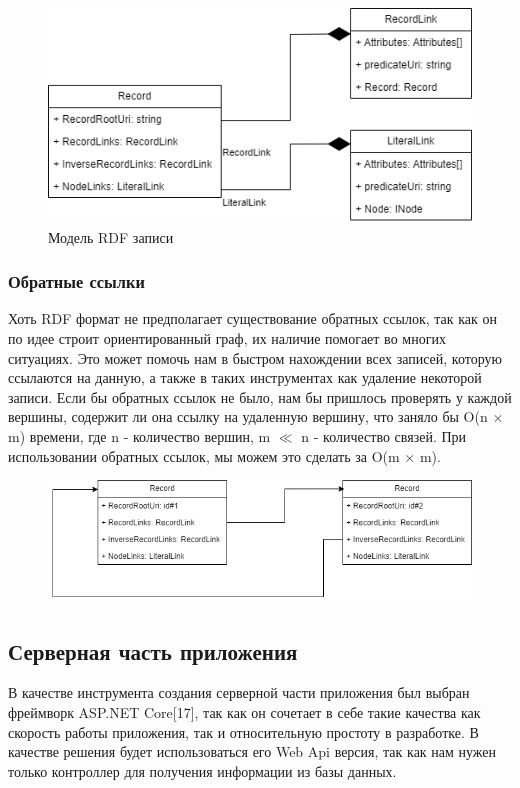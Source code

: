 \documentclass[12pt]{article}
\begin{document}
\begin{figure}[!ht]
    \includegraphics[width=1\textwidth]{_images/record_literal.png}
    \caption{Модель RDF записи}
    \label{fig:record}
\end{figure}

\subsubsection{Обратные ссылки} \label{sect:inv_link}
\qquad Хоть RDF формат не предполагает существование обратных ссылок, так как он по идее строит ориентированный граф, их наличие помогает во многих ситуациях. Это может помочь нам в быстром нахождении всех записей, которую ссылаются на данную, а также в таких инструментах как удаление некоторой записи. Если бы обратных ссылок не было, нам бы пришлось проверять у каждой вершины, содержит ли она ссылку на удаленную вершину, что заняло бы O(n $\times$ m) времени, где n - количество вершин, m $\ll$ n - количество связей. При использовании обратных ссылок, мы можем это сделать за O(m $\times$ m).

\begin{figure}[!b]
    \centering
    \includegraphics[width=1\textwidth]{_images/inverse_link.png}
\end{figure}

\subsection{Серверная часть приложения}
\qquad В качестве инструмента создания серверной части приложения был выбран фреймворк ASP.NET Core[17], так как он сочетает в себе такие качества как скорость работы приложения, так и относительную простоту в разработке. В качестве решения будет использоваться его Web Api версия, так как нам нужен только контроллер для получения информации из базы данных.
\end{document}
